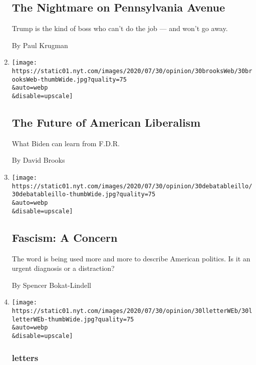 \begin{enumerate}
  \hypertarget{the-nightmare-on-pennsylvania-avenue}{%
  \subsection{The Nightmare on Pennsylvania
  Avenue}\label{the-nightmare-on-pennsylvania-avenue}}

  Trump is the kind of boss who can't do the job --- and won't go away.

  By Paul Krugman
\item
  \href{/2020/07/30/opinion/biden-fdr.html}{}

  \texttt{[image: https://static01.nyt.com/images/2020/07/30/opinion/30brooksWeb/30brooksWeb-thumbWide.jpg?quality=75\\\&auto=webp\\\&disable=upscale]}

  \hypertarget{the-future-of-american-liberalism}{%
  \subsection{The Future of American
  Liberalism}\label{the-future-of-american-liberalism}}

  What Biden can learn from F.D.R.

  By David Brooks
\item
  \href{/2020/07/30/opinion/fascism-us.html}{}

  \texttt{[image: https://static01.nyt.com/images/2020/07/30/opinion/30debatableillo/30debatableillo-thumbWide.jpg?quality=75\\\&auto=webp\\\&disable=upscale]}

  \hypertarget{fascism-a-concern}{%
  \subsection{Fascism: A Concern}\label{fascism-a-concern}}

  The word is being used more and more to describe American politics. Is
  it an urgent diagnosis or a distraction?

  By Spencer Bokat-Lindell
\item
  \href{/2020/07/30/opinion/letters/john-lewis-civil-rights.html}{}

  \texttt{[image: https://static01.nyt.com/images/2020/07/30/opinion/30lletterWEb/30lletterWEb-thumbWide.jpg?quality=75\\\&auto=webp\\\&disable=upscale]}

  \hypertarget{letters-2}{%
  \subsubsection{letters}\label{letters-2}}


\end{enumerate}
